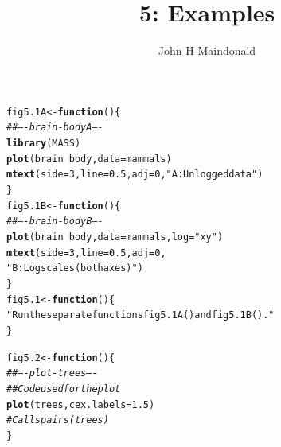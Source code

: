 \documentclass[12pt, a4paper,  BCOR=8.25mm, DIV=15]{scrartcl}\usepackage[]{graphicx}\usepackage[]{color}
\makeatletter
\newcommand{\hlnum}[1]{\textcolor[rgb]{0.686,0.059,0.569}{#1}}%
\newcommand{\hlstr}[1]{\textcolor[rgb]{0.192,0.494,0.8}{#1}}%
\newcommand{\hlcom}[1]{\textcolor[rgb]{0.678,0.584,0.686}{\textit{#1}}}%
\newcommand{\hlopt}[1]{\textcolor[rgb]{0,0,0}{#1}}%
\newcommand{\hlstd}[1]{\textcolor[rgb]{0.345,0.345,0.345}{#1}}%
\newcommand{\hlkwa}[1]{\textcolor[rgb]{0.161,0.373,0.58}{\textbf{#1}}}%
\newcommand{\hlkwb}[1]{\textcolor[rgb]{0.69,0.353,0.396}{#1}}%
\newcommand{\hlkwc}[1]{\textcolor[rgb]{0.333,0.667,0.333}{#1}}%
\newcommand{\hlkwd}[1]{\textcolor[rgb]{0.737,0.353,0.396}{\textbf{#1}}}%
\newenvironment{kframe}{%
 \def\at@end@of@kframe{}%
 \ifinner\ifhmode%
  \def\at@end@of@kframe{\end{minipage}}%
  \begin{minipage}{\columnwidth}%
 \fi\fi%
 \def\FrameCommand##1{\hskip\@totalleftmargin \hskip-\fboxsep
 \colorbox{shadecolor}{##1}\hskip-\fboxsep
     \hskip-\linewidth \hskip-\@totalleftmargin \hskip\columnwidth}%
 \MakeFramed {\advance\hsize-\width
   \@totalleftmargin\z@ \linewidth\hsize
   \@setminipage}}%
 {\par\unskip\endMakeFramed%
 \at@end@of@kframe}
\newenvironment{knitrout}{}{} %
\makeatother
\begin{document}



\title{5: Examples }
\author{John H Maindonald}
\maketitle

\begin{knitrout}
\color{fgcolor}\begin{kframe}
\begin{alltt}
\hlstd{fig5.1A} \hlkwb{<-} \hlkwa{function}\hlstd{()\{}
\hlcom{## ---- brain-bodyA ----}
\hlkwd{library}\hlstd{(MASS)}
\hlkwd{plot}\hlstd{(brain} \hlopt{~} \hlstd{body,} \hlkwc{data}\hlstd{=mammals)}
\hlkwd{mtext}\hlstd{(}\hlkwc{side}\hlstd{=}\hlnum{3}\hlstd{,} \hlkwc{line}\hlstd{=}\hlnum{0.5}\hlstd{,} \hlkwc{adj}\hlstd{=}\hlnum{0}\hlstd{,} \hlstr{"A: Unlogged data"}\hlstd{)}
\hlstd{\}}
\hlstd{fig5.1B} \hlkwb{<-} \hlkwa{function}\hlstd{()\{}
\hlcom{## ---- brain-bodyB ----}
\hlkwd{plot}\hlstd{(brain} \hlopt{~} \hlstd{body,} \hlkwc{data}\hlstd{=mammals,} \hlkwc{log}\hlstd{=}\hlstr{"xy"}\hlstd{)}
\hlkwd{mtext}\hlstd{(}\hlkwc{side}\hlstd{=}\hlnum{3}\hlstd{,} \hlkwc{line}\hlstd{=}\hlnum{0.5}\hlstd{,} \hlkwc{adj}\hlstd{=}\hlnum{0}\hlstd{,}
      \hlstr{"B: Log scales (both axes)"}\hlstd{)}
\hlstd{\}}
\hlstd{fig5.1} \hlkwb{<-} \hlkwa{function}\hlstd{()\{}
\hlstr{"Run the separate functions fig5.1A() and fig5.1B()."}
\hlstd{\}}
\end{alltt}
\end{kframe}
\end{knitrout}

\begin{knitrout}
\color{fgcolor}\begin{kframe}
\begin{alltt}
\hlstd{fig5.2} \hlkwb{<-} \hlkwa{function}\hlstd{()\{}
\hlcom{## ---- plot-trees ----}
\hlcom{## Code used for the plot}
\hlkwd{plot}\hlstd{(trees,} \hlkwc{cex.labels}\hlstd{=}\hlnum{1.5}\hlstd{)}
  \hlcom{# Calls pairs(trees)}
\hlstd{\}}
\end{alltt}
\end{kframe}
\end{knitrout}
\end{document}
